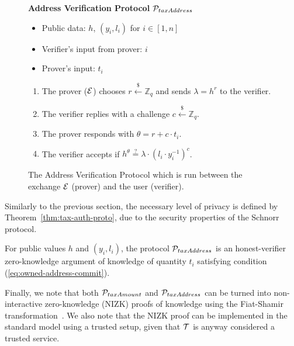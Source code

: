 \begin{figure}[h]
\begin{mdframed}

\begin{center}
    \textbf{Address Verification Protocol} $\mathcal{P}_{taxAddress}$
\end{center}

    \begin{itemize}
        \item Public data: $h$, $(y_i, l_i)$ for $i \in [1, n]$
        \item Verifier's input from prover: $i$
        \item Prover's input: $t_i$
    \end{itemize}

    \begin{enumerate}
        \item The prover ($\mathcal{E}$) chooses $r \xleftarrow{\$} \mathbb{Z}_q$
            and sends $\lambda = h^r$ to the verifier.
        \item The verifier replies with a challenge $c \xleftarrow{\$} \mathbb{Z}_q$.
        \item The prover responds with $\theta = r + c \cdot t_i$.
        \item The verifier accepts if $h^\theta \stackrel{?}{=} \lambda \cdot (l_i \cdot y_i^{-1})^c$.
    \end{enumerate}

\end{mdframed}
\caption{
    The Address Verification Protocol which is run between the exchange $\mathcal{E}$
    (prover) and the user (verifier).
}
\label{fig:taxation_verification_proto}
\end{figure}

Similarly to the previous section, the necessary level of privacy is defined by
Theorem~\ref{thm:tax-auth-proto}, due to the security properties of the Schnorr
protocol.

\begin{theorem}
    For public values $h$ and $(y_i, l_i)$, the protocol
    $\mathcal{P}_{taxAddress}$ is an honest-verifier zero-knowledge argument of
    knowledge of quantity $t_i$ satisfying condition (\ref{eq:owned-address-commit}).
\end{theorem}

Finally, we note that both $\mathcal{P}_{taxAmount}$ and $\mathcal{P}_{taxAddress}$ can be
turned into non-interactive zero-knowledge (NIZK) proofs of knowledge using the
Fiat-Shamir transformation~\cite{C:FiaSha86}. We also note that the NIZK proof
can be implemented in the standard model using a trusted setup, given that
$\mathcal{T}$ is anyway considered a trusted service.
